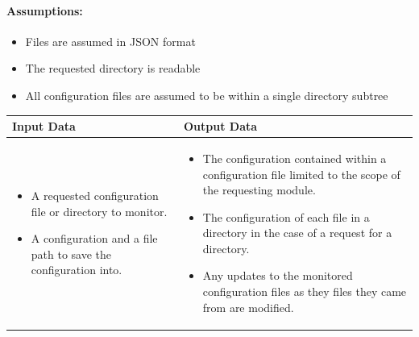 \documentclass[english,12pt]{scrartcl}
\begin{document}
		\paragraph{Assumptions:}
		\begin{itemize}
			\item Files are assumed in JSON format
			\item The requested directory is readable
			\item All configuration files are assumed to be within a single directory subtree
		\end{itemize}
		
		\begin{tabular}{p{7cm}|p{7cm}}
    			\textbf{Input Data} & \textbf{Output Data} \\ \hline
			\begin{itemize}
				\item A requested configuration file or directory to monitor.
				\item A configuration and a file path to save the configuration into.
			\end{itemize}
			&
			\begin{itemize}
				\item The configuration contained within a configuration file limited to the scope of the requesting module.
				\item The configuration of each file in a directory in the case of a request for a directory.
				\item Any updates to the monitored configuration files as they files they came from are modified.
			\end{itemize}
		\end{tabular}
\end{document}
